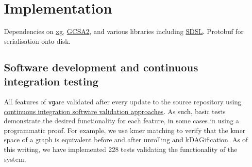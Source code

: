 \documentclass[12pt]{article}
\newcommand{\vg}{{\tt vg}}
\begin{document}
\section{Implementation}

Dependencies on \href{}{xg}, \href{}{GCSA2}, and various libraries including \href{}{SDSL}. 
Protobuf for serialisation onto disk.

\subsection{Software development and continuous integration testing}

All features of \vg are validated after every update to the source repository using \href{https://travis-ci.org/vgteam/vg}{continuous integration software validation approaches}.
As such, basic tests demonstrate the desired functionality for each feature, in some cases in using a programmatic proof.
For example, we use kmer matching to verify that the kmer space of a graph is equivalent before and after unrolling and kDAGification.
As of this writing, we have implemented 228 tests validating the functionality of the system.
\end{document}
